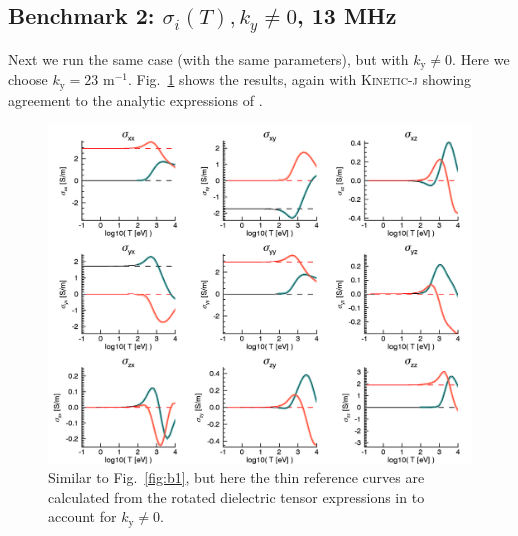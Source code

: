 \documentclass[final,5p,times,twocolumn]{elsarticle}
\newcommand{\kj}{\textsc{Kinetic-j}\xspace}
\begin{document}
\subsection{Benchmark 2: $\sigma_i\left(T\right), k_{y}\ne 0$, 13 MHz}
\label{section:verification2}
%
Next we run the same case (with the same parameters), but with $k_{\mathrm{y}}\ne 0$. Here we choose $k_{\mathrm{y}}=23$ m$^{\mathrm{-1}}$. Fig.~\ref{fig:b2} shows the results, again with \kj showing agreement to the analytic expressions of \cite{swanson}.
%
\begin{figure}
\centering
\includegraphics[]{figures/benchmark2}
\caption{Similar to Fig.~\ref{fig:b1}, but here the thin reference curves are calculated from the rotated dielectric tensor expressions in \cite[Pg. 176 of][]{swanson} to account for  $k_{\mathrm{y}}\ne 0$.}
\label{fig:b2}
\end{figure}
%
\end{document}
